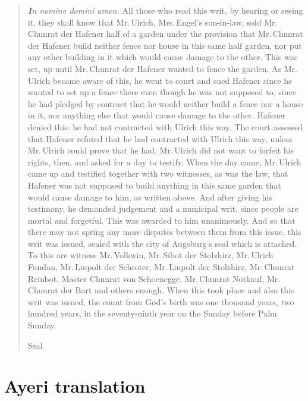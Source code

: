 \documentclass[12pt,paper=a4]{scrartcl}
\begin{document}
\blockquote{\emph{\textbf{I}n nomine domini amen.} All those who read this writ, by hearing or seeing it, they shall know that Mr.\,Ulrich, Mrs.\,Engel's son-in-law, sold Mr.\,Chunrat der Hafener half of a garden under the provision that Mr.\,Chunrat der Hafener build neither fence nor house in this same half garden, nor put any other building in it which would cause damage to the other. This was set, up until Mr.\,Chunrat der Hafener wanted to fence the garden. As Mr.\,Ulrich became aware of this, he went to court and sued Hafener since he wanted to set up a fence there even though he was not supposed to, since he had pledged by contract that he would neither build a fence nor a house in it, nor anything else that would cause damage to the other. Hafener denied this: he had not contracted with Ulrich this way. The court assessed that Hafener refuted that he had contracted with Ulrich this way, unless Mr.\,Ulrich could prove that he had. Mr.\,Ulrich did not want to forfeit his rights, then, and asked for a day to testify. When the day came, Mr.\,Ulrich came up and testified together with two witnesses, as was the law, that Hafener was not supposed to build anything in this same garden that would cause damage to him, as written above. And after giving his testimony, he demanded judgement and a municipal writ, since people are mortal and forgetful. This was awarded to him unanimously. And so that there may not spring any more disputes between them from this issue, this writ was issued, sealed with the city of Augsburg's seal which is attached. To this are witness Mr.\,Volkwin, Mr.\,Sibot der Stolzhirz, Mr.\,Ulrich Fundan, Mr.\,Liupolt der Schroter, Mr.\,Liupolt der Stolzhirz, Mr.\,Chunrat Reinbot, Master Chunrat von Schoenegge, Mr.\,Chunrat Notkauf, Mr.\,Chunrat der Bart and others enough. When this took place and also this writ was issued, the count from God's birth was one thousand years, two hundred years, in the seventy-ninth year on the Sunday before Palm Sunday.

\begin{center}
Seal
\end{center}}

\section{Ayeri translation}


\printbibliography
\end{document}
